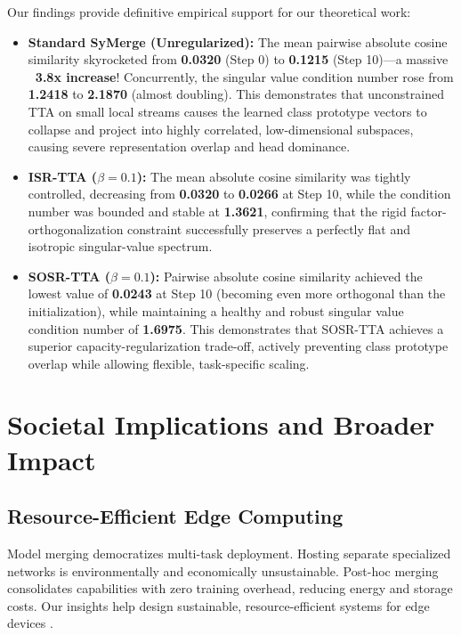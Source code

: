\documentclass{article}
\theoremstyle{plain}
\theoremstyle{definition}
\theoremstyle{remark}
\begin{document}
Our findings provide definitive empirical support for our theoretical work:
\begin{itemize}
  \item \textbf{Standard SyMerge (Unregularized):} The mean pairwise absolute cosine similarity skyrocketed from \textbf{0.0320} (Step 0) to \textbf{0.1215} (Step 10)—a massive \textbf{~3.8x increase}! Concurrently, the singular value condition number rose from \textbf{1.2418} to \textbf{2.1870} (almost doubling). This demonstrates that unconstrained TTA on small local streams causes the learned class prototype vectors to collapse and project into highly correlated, low-dimensional subspaces, causing severe representation overlap and head dominance.
  \item \textbf{ISR-TTA ($\beta = 0.1$):} The mean absolute cosine similarity was tightly controlled, decreasing from \textbf{0.0320} to \textbf{0.0266} at Step 10, while the condition number was bounded and stable at \textbf{1.3621}, confirming that the rigid factor-orthogonalization constraint successfully preserves a perfectly flat and isotropic singular-value spectrum.
  \item \textbf{SOSR-TTA ($\beta = 0.1$):} Pairwise absolute cosine similarity achieved the lowest value of \textbf{0.0243} at Step 10 (becoming even more orthogonal than the initialization), while maintaining a healthy and robust singular value condition number of \textbf{1.6975}. This demonstrates that SOSR-TTA achieves a superior capacity-regularization trade-off, actively preventing class prototype overlap while allowing flexible, task-specific scaling.
\end{itemize}

\section{Societal Implications and Broader Impact}
\label{sec:impact}

\subsection{Resource-Efficient Edge Computing}
Model merging democratizes multi-task deployment. Hosting separate specialized networks is environmentally and economically unsustainable. Post-hoc merging consolidates capabilities with zero training overhead, reducing energy and storage costs. Our insights help design sustainable, resource-efficient systems for edge devices \cite{lialin2023scaling,goddard2024mergekit}.
\end{document}
